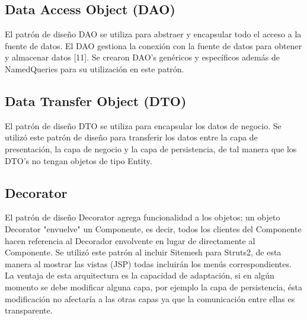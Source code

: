 \subsection{Data Access Object (DAO)}
El patrón de diseño DAO se utiliza para abstraer y encapsular todo el acceso a la fuente de datos. El DAO gestiona la conexión con la fuente de datos para obtener y almacenar datos [11]. Se crearon DAO’s genéricos y específicos además de NamedQueries para su utilización en este patrón.

\subsection{Data Transfer Object (DTO)}
El patrón de diseño DTO se utiliza para encapsular los datos de negocio. Se utilizó este patrón de diseño para transferir los datos entre la capa de presentación, la capa de negocio y la capa de persistencia, de tal manera que los DTO’s no tengan objetos de tipo Entity.

\subsection{Decorator}
El patrón de diseño Decorator agrega funcionalidad a los objetos; un objeto Decorator "envuelve" un Componente, es decir, todos los clientes del Componente hacen referencia al Decorador envolvente en lugar de directamente al Componente. Se utilizó este patrón al incluir Sitemesh para Struts2, de esta manera al mostrar las vistas (JSP) todas incluirán los menús correspondientes.\\

La ventaja de esta arquitectura es la capacidad de adaptación, si en algún momento se debe modificar alguna capa, por ejemplo la capa de persistencia, ésta modificación no afectaría a las otras capas ya que la comunicación entre ellas es transparente.
